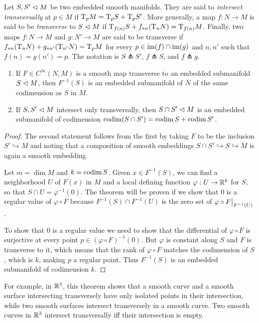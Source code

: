 \begin{defn}[Transversality]
Let $S,S'\vartriangleleft M$ be two embedded smooth manifolds. They are said to \emph{intersect transversally} at $p\in M$ if $\mathrm{T}_p M=\mathrm{T}_p S+ \mathrm{T}_p S'$. More generally, a map $f:N\to M$ is said to be \emph{transverse} to $S\vartriangleleft M$ if $\mathrm{T}_{f(n)}S+f_{\ast n}(\mathrm{T}_n N)=\mathrm{T}_{f(n)}M$. Finally, two maps $f:N\to M$ and $g:N'\to M$ are said to be transverse if $f_{\ast n}(\mathrm{T}_nN)+g_{\ast n'}(\mathrm{T}_{n'}N)=\mathrm{T}_p M$ for every $p\in\operatorname{im}(f)\cap\operatorname{im}(g)$ and $n,n'$ such that $f(n)=g(n')=p$. The notation is $S\pitchfork S'$, $f\pitchfork S$, and $f\pitchfork g$.
\end{defn}
\begin{thm}\label{thm 6.30 Lee}
\begin{enumerate}
    \item If $F\in C^\infty(N,M)$ is a smooth map transverse to an embedded submanifold $S\vartriangleleft M$, then $F^{-1}(S)$ is an embedded submanifold of $N$ of the same codimension as $S$ in $M$.
    \item If $S,S'\vartriangleleft M$ intersect only transversally, then $S\cap S'\vartriangleleft M$ is an embedded submanifold of codimension  $\operatorname{codim}(S\cap S')=\operatorname{codim} S+\operatorname{codim} S'$.
\end{enumerate}
\end{thm}
\begin{proof}
The second statement follows from the first by taking $F$ to be the inclusion $S'\hookrightarrow M$ and noting that a composition of smooth embeddings $S\cap S'\hookrightarrow S\hookrightarrow M$ is again a smooth embedding.

Let $m=\dim M$ and $k=\operatorname{codim} S$. Given $x\in F^{-1}(S)$, we can find a neighborhood $U$ of $F(x)$ in $M$ and a local defining function $\varphi:U\to \mathbb{R}^k$ for $S$, so that $S\cap U=\varphi^{-1}(0)$. The theorem will be proven if we show that $0$ is a regular value of $\varphi\circ F$ because $F^{-1}(S)\cap F^{-1}(U)$ is the zero set of $\varphi\circ \restr{F}{F^{-1}(U)}$.

To show that $0$ is a regular value we need to show that the differential of $\varphi\circ F$ is surjective at every point $p\in (\varphi\circ F)^{-1}(0)$. But $\varphi$ is constant along $S$ and $F$ is transverse to it, which means that the rank of $\varphi\circ F$ matches the codimension of $S$, which is $k$, making $p$ a regular point. Thus $F^{-1}(S)$ is an embedded submanifold of codimension $k$.
\end{proof}

For example, in $\mathbb{R}^3$, this theorem shows that a smooth curve and a smooth surface intersecting transversely have only isolated points in their intersection, while two smooth surfaces intersect transversely in a smooth curve. Two smooth curves in $\mathbb{R}^3$ intersect transversally iff their intersection is empty.


